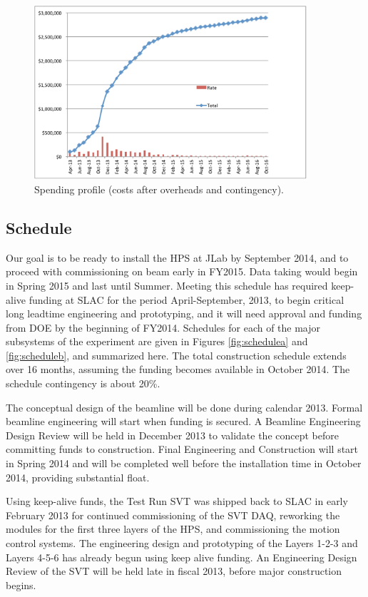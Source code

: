 \begin{figure}[ht]
\centering
\includegraphics[width=0.9\textwidth]{cost_schedule/spending} 
\caption{Spending profile (costs after overheads and contingency).}
\label{fig:spending_profile}
\end{figure}

\subsection{Schedule}
Our goal is to be ready to install the HPS at JLab by September 2014, and to proceed with commissioning on beam early in FY2015. Data taking 
would begin in Spring 2015 and last until Summer. Meeting this schedule has required keep-alive funding at SLAC for the period April-September, 2013, 
to begin critical long leadtime engineering and prototyping, and it will need  approval and funding from DOE by the beginning of FY2014. Schedules 
for each of the major subsystems of the experiment are given in Figures \ref{fig:schedulea} and \ref{fig:scheduleb}, and summarized here. 
The total construction schedule extends over 16 months, 
assuming the funding becomes available in October 2014. The schedule contingency is about 20\%.
 
The conceptual design of the beamline will be done during calendar 2013. Formal beamline engineering will start when funding is secured. A Beamline Engineering 
Design Review will be held in December 2013 to validate the concept before committing funds to construction. 
Final Engineering and Construction will start in Spring 2014 and will be completed well before the installation time in October 2014, providing substantial float. 

Using keep-alive funds, the Test Run SVT was shipped back to SLAC in early February 2013 for continued commissioning of the SVT DAQ, reworking the 
modules for the first three layers of the HPS, and commissioning the motion control systems. The engineering design and prototyping of the Layers 1-2-3 and 
Layers 4-5-6 has already begun using keep alive funding. An Engineering Design Review of the SVT will be held late in fiscal 2013, before major construction
begins. 

